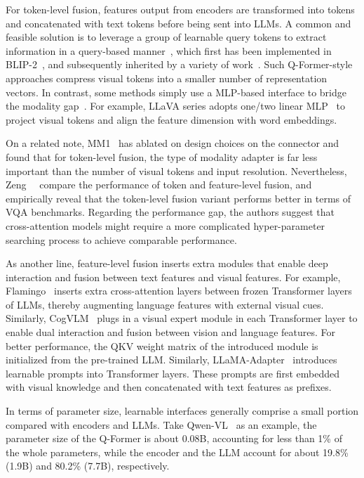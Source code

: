 For token-level fusion, features output from encoders are transformed into tokens and concatenated with text tokens before being sent into LLMs. A common and feasible solution is to leverage a group of learnable query tokens to extract information in a query-based manner~\cite{carion2020end}, which first has been implemented in BLIP-2~\cite{li2023blip}, and subsequently inherited by a variety of work~\cite{x-llm, instructblip, video-llama}. Such Q-Former-style approaches compress visual tokens into a smaller number of representation vectors.
In contrast, some methods simply use a MLP-based interface to bridge the modality gap~\cite{llava, pmc-vqa, pandagpt, detgpt}. 
For example, LLaVA series adopts one/two linear MLP~\cite{llava, liu2023improved} to project visual tokens and align the feature dimension with word embeddings.

On a related note, MM1~\cite{mckinzie2024mm1} has ablated on design choices on the connector and found that for token-level fusion, the type of modality adapter is far less important than the number of visual tokens and input resolution. 
Nevertheless, Zeng~\etal~\cite{zeng2023matters} compare the performance of token and feature-level fusion, and empirically reveal that the token-level fusion variant performs better in terms of VQA benchmarks. Regarding the performance gap, the authors suggest that cross-attention models might require a more complicated hyper-parameter searching process to achieve comparable performance. 

As another line, feature-level fusion inserts extra modules that enable deep interaction and fusion between text features and visual features. For example, Flamingo~\cite{alayrac2022flamingo} inserts extra cross-attention layers between frozen Transformer layers of LLMs, thereby augmenting language features with external visual cues. Similarly, CogVLM~\cite{wang2023cogvlm} plugs in a visual expert module in each Transformer layer to enable dual interaction and fusion between vision and language features. For better performance, the QKV weight matrix of the introduced module is initialized from the pre-trained LLM.
Similarly, LLaMA-Adapter~\cite{llama-adapter} introduces learnable prompts into Transformer layers. These prompts are first embedded with visual knowledge and then concatenated with text features as prefixes.

In terms of parameter size, learnable interfaces generally comprise a small portion compared with encoders and LLMs. Take Qwen-VL~\cite{bai2023qwen} as an example, the parameter size of the Q-Former is about 0.08B, accounting for less than 1\% of the whole parameters, while the encoder and the LLM account for about 19.8\% (1.9B) and 80.2\% (7.7B), respectively.

